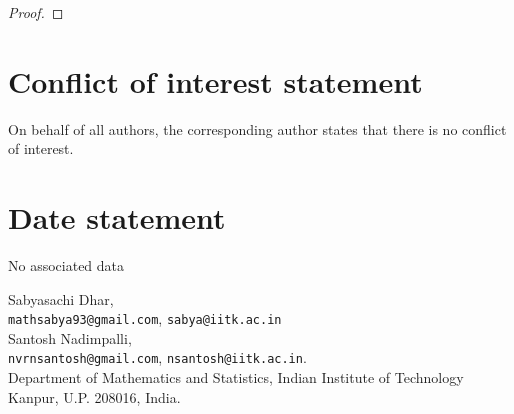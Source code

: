 \documentclass[10pt, reqno]{amsart}
\theoremstyle{plain}
\numberwithin{equation}{section} \newcommand{\di}{\operatorname{dim}}
\begin{document}
\begin{proof}
\end{proof}

\section{Conflict of interest statement}
On behalf of all authors, the corresponding author states that there
is no conflict of interest.

\section{Date statement}
No associated data

	
 

Sabyasachi Dhar,\\
\texttt{mathsabya93@gmail.com},
\texttt{sabya@iitk.ac.in}\\
Santosh Nadimpalli, \\
\texttt{nvrnsantosh@gmail.com}, \texttt{nsantosh@iitk.ac.in}.\\
Department of Mathematics and Statistics, Indian
Institute of Technology Kanpur, U.P. 208016, India.
\end{document}
